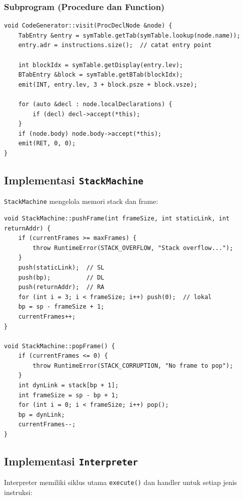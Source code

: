 \documentclass[12pt,a4paper]{article}
\begin{document}
\subsubsection{Subprogram (Procedure dan Function)}

\begin{lstlisting}[style=cpp, caption={Implementasi deklarasi prosedur}]
void CodeGenerator::visit(ProcDeclNode &node) {
    TabEntry &entry = symTable.getTab(symTable.lookup(node.name));
    entry.adr = instructions.size();  // catat entry point

    int blockIdx = symTable.getDisplay(entry.lev);
    BTabEntry &block = symTable.getBTab(blockIdx);
    emit(INT, entry.lev, 3 + block.psze + block.vsze);

    for (auto &decl : node.localDeclarations) {
        if (decl) decl->accept(*this);
    }
    if (node.body) node.body->accept(*this);
    emit(RET, 0, 0);
}
\end{lstlisting}

\subsection{Implementasi \texttt{StackMachine}}

\texttt{StackMachine} mengelola memori stack dan frame:

\begin{lstlisting}[style=cpp, caption={Implementasi pushFrame dan popFrame}]
void StackMachine::pushFrame(int frameSize, int staticLink, int returnAddr) {
    if (currentFrames >= maxFrames) {
        throw RuntimeError(STACK_OVERFLOW, "Stack overflow...");
    }
    push(staticLink);  // SL
    push(bp);          // DL
    push(returnAddr);  // RA
    for (int i = 3; i < frameSize; i++) push(0);  // lokal
    bp = sp - frameSize + 1;
    currentFrames++;
}

void StackMachine::popFrame() {
    if (currentFrames <= 0) {
        throw RuntimeError(STACK_CORRUPTION, "No frame to pop");
    }
    int dynLink = stack[bp + 1];
    int frameSize = sp - bp + 1;
    for (int i = 0; i < frameSize; i++) pop();
    bp = dynLink;
    currentFrames--;
}
\end{lstlisting}

\subsection{Implementasi \texttt{Interpreter}}

Interpreter memiliki siklus utama \texttt{execute()} dan handler untuk setiap
jenis instruksi:
\end{document}
